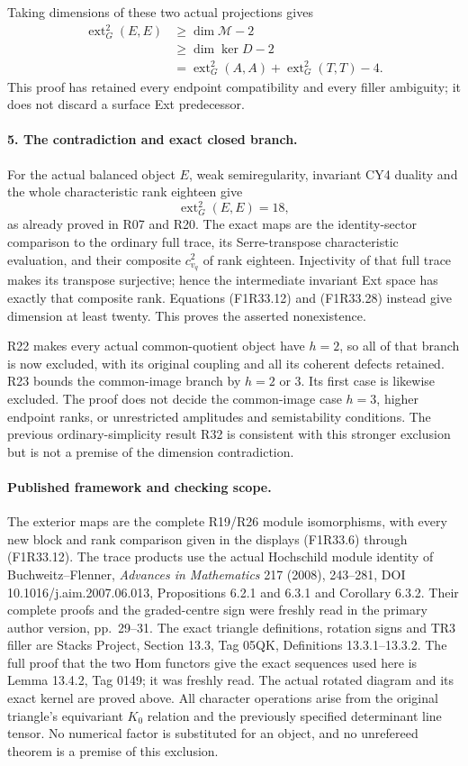 Taking dimensions of these two
actual projections gives
\[
 \begin{split}
 \operatorname{ext}^2_G(E,E)
   &\ge \dim\mathcal M-2\\
   &\ge \dim\ker D-2\\
   &=\operatorname{ext}^2_G(A,A)
             +\operatorname{ext}^2_G(T,T)-4.
 \end{split}
 \tag{F1R33.28}
\]
This proof has retained every
endpoint compatibility and every
filler ambiguity; it does not
discard a surface Ext predecessor.

\paragraph{5. The contradiction and exact closed branch.}
For the actual balanced object $E$,
weak semiregularity, invariant CY4
duality and the whole characteristic
rank eighteen give
\[
                       \operatorname{ext}^2_G(E,E)=18,
 \tag{F1R33.29}
\]
as already proved in R07 and R20.
The exact maps are the identity-sector
comparison to the ordinary full trace,
its Serre-transpose characteristic
evaluation, and their composite
$c^2_{v_q}$ of rank eighteen.
Injectivity of that full trace makes
its transpose surjective; hence
the intermediate invariant Ext space
has exactly that composite rank.
Equations (F1R33.12) and
(F1R33.28) instead give dimension
at least twenty. This proves the
asserted nonexistence.

R22 makes every actual common-quotient
object have $h=2$, so all of that
branch is now excluded, with its
original coupling and all its
coherent defects retained.
R23 bounds the common-image branch
by $h=2$ or $3$. Its first case
is likewise excluded. The proof
does not decide the common-image
case $h=3$, higher endpoint ranks,
or unrestricted amplitudes and
semistability conditions. The
previous ordinary-simplicity result
R32 is consistent with this stronger
exclusion but is not a premise of
the dimension contradiction.

\paragraph{Published framework and checking scope.}
The exterior maps are the complete
R19/R26 module isomorphisms, with
every new block and rank comparison
given in the displays (F1R33.6) through (F1R33.12).
The trace products use the actual
Hochschild module identity of
Buchweitz--Flenner, \emph{Advances
in Mathematics} 217 (2008),
243--281, DOI 10.1016/j.aim.2007.06.013,
Propositions 6.2.1 and 6.3.1 and
Corollary 6.3.2. Their complete
proofs and the graded-centre sign
were freshly read in the primary
author version, pp.~29--31.
The exact triangle definitions,
rotation signs and TR3 filler are
Stacks Project, Section 13.3,
Tag 05QK, Definitions 13.3.1--13.3.2.
The full proof that the two Hom
functors give the exact sequences
used here is Lemma 13.4.2, Tag 0149;
it was freshly read. The actual
rotated diagram and its exact
kernel are proved above.
All character operations arise
from the original triangle's
equivariant $K_0$ relation and the
previously specified determinant
line tensor. No numerical factor
is substituted for an object,
and no unrefereed theorem is a
premise of this exclusion.

